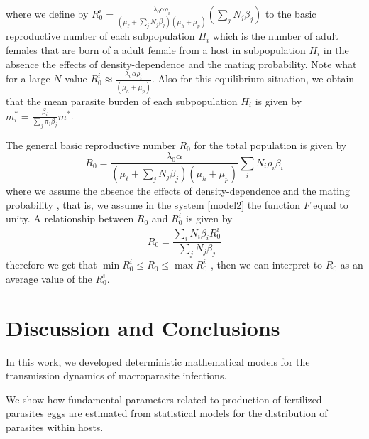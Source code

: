 \documentclass[12pt,a4paper]{article}
\theoremstyle{plain}%
\theoremstyle{definition}
\theoremstyle{remark}
\begin{document}
where we define by
$R_0^{i}=\frac{ \lambda_0 \alpha \rho_{i}}{ (\mu_{\ell}+\sum_j N_j \beta_j )(\mu_{h}+\mu_p)} \left( \sum_j N_j\beta_{j} \right) $
to the basic reproductive number of each subpopulation $H_{i}$
which is the number of adult females 
that are born of a 
adult female from a host in subpopulation $H_{i}$ in the absence the effects of density-dependence and the mating probability.
Note  what for a large $N$ value $R_0^i\approx \frac{ \lambda_0 \alpha  \rho_i }{ (\mu_h + \mu_p) }$.  
Also for this equilibrium situation, we obtain that the mean parasite burden of each subpopulation $H_{i}$ is given by $m_{i}^*=\frac{\beta_{i}}{ \sum_j \pi_j\beta_{j } }m^*$.

The general basic reproductive number $R_0$ for the total population is given by %
\begin{equation}\label{valorR0}
	R_{0}=\frac{\lambda_0 \alpha }
	{ (\mu_{\ell}+\sum_j N_j \beta_j  )(\mu_{h}+\mu_p)}
	\sum_i N_i \rho_{i} \beta_{i}   
\end{equation}
where we assume the absence the effects of density-dependence and the mating probability \cite{anderson1992infectious}, that is, we assume in the system \eqref{model2} the function $F$ equal to unity.
A relationship between $R_0$ and $R_0^i$ is given by
\begin{equation}
R_{0}=\frac{\sum_i N_i\beta_{i}R_0^i}
{\sum_j N_j \beta_{j}}   
\end{equation}
therefore we get that $\min R_0^i\leq R_0 \leq \max R_0^i$
, then we can interpret to $R_0$ as an average value of the $R_0^i$.

\section{Discussion and Conclusions}
In this work, we developed deterministic mathematical models for the transmission dynamics of macroparasite infections. 

We show how fundamental parameters related to production of fertilized parasites eggs are estimated from statistical models for the distribution of
parasites within hosts.	
\end{document}
